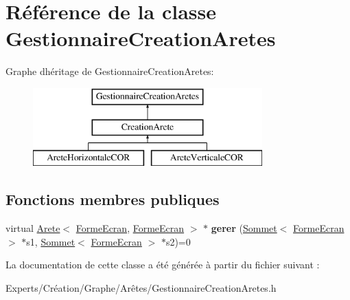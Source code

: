 \hypertarget{class_gestionnaire_creation_aretes}{}\section{Référence de la classe Gestionnaire\+Creation\+Aretes}
\label{class_gestionnaire_creation_aretes}
Graphe d\textquotesingle{}héritage de Gestionnaire\+Creation\+Aretes\+:\begin{figure}[H]
\begin{center}
\leavevmode
\includegraphics[height=3.000000cm]{class_gestionnaire_creation_aretes}
\end{center}
\end{figure}
\subsection*{Fonctions membres publiques}
\begin{DoxyCompactItemize}
\item 
\mbox{\label{class_gestionnaire_creation_aretes_aa43668a8891469ec656802bd699ae3cc}} 
virtual \mbox{\hyperlink{class_arete}{Arete}}$<$ \mbox{\hyperlink{class_forme_ecran}{Forme\+Ecran}}, \mbox{\hyperlink{class_forme_ecran}{Forme\+Ecran}} $>$ $\ast$ {\bfseries gerer} (\mbox{\hyperlink{class_sommet}{Sommet}}$<$ \mbox{\hyperlink{class_forme_ecran}{Forme\+Ecran}} $>$ $\ast$s1, \mbox{\hyperlink{class_sommet}{Sommet}}$<$ \mbox{\hyperlink{class_forme_ecran}{Forme\+Ecran}} $>$ $\ast$s2)=0
\end{DoxyCompactItemize}


La documentation de cette classe a été générée à partir du fichier suivant \+:\begin{DoxyCompactItemize}
\item 
Experts/\+Création/\+Graphe/\+Arêtes/Gestionnaire\+Creation\+Aretes.\+h\end{DoxyCompactItemize}
